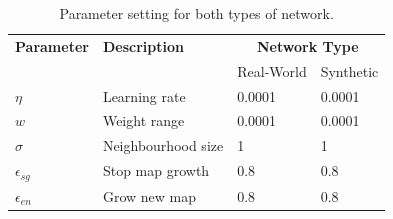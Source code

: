 \documentclass{article}
\begin{document}
\begin{table}
\centering
\begin{tabular}{ l p{2.5cm} l l }
\toprule
\textbf{Parameter} & \textbf{Description} & \multicolumn{2}{c}{\textbf{Network Type}} \\
{} & {} & Real-World & Synthetic \\ 
\bottomrule
$\eta$ & Learning rate & 0.0001 & 0.0001 \\ 
$w$ & Weight range & 0.0001 & 0.0001 \\
$\sigma$ & Neighbourhood size & 1 & 1 \\
$\epsilon_{sg}$ & Stop map growth & 0.8 & 0.8 \\
$\epsilon_{en}$ & Grow new map & 0.8 & 0.8 \\
\bottomrule
\end{tabular}
\caption{Parameter setting for both types of network.}
\label{parametersettings}
\end{table}

\end{document}
